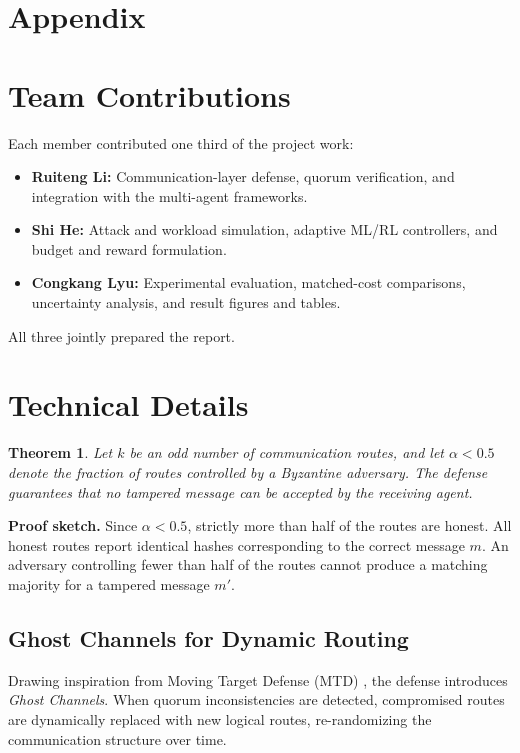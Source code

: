 \documentclass{article}
\newtheorem{theorem}{Theorem}
\begin{document}
\clearpage


\clearpage
\appendix
\section*{Appendix}
\section{Team Contributions}
Each member contributed one third of the project work:
\begin{itemize}
    \item \textbf{Ruiteng Li:} Communication-layer defense, quorum verification, and integration with the multi-agent frameworks.
    \item \textbf{Shi He:} Attack and workload simulation, adaptive {ML}/{RL} controllers, and budget and reward formulation.
    \item \textbf{Congkang Lyu:} Experimental evaluation, matched-cost comparisons, uncertainty analysis, and result figures and tables.
\end{itemize}
All three jointly prepared the report.

\section{Technical Details}
\begin{theorem}
Let $k$ be an odd number of communication routes, and let $\alpha < 0.5$ denote the fraction of routes controlled by a Byzantine adversary. The defense guarantees that no tampered message can be accepted by the receiving agent.
\end{theorem}
\textbf{Proof sketch.} Since $\alpha < 0.5$, strictly more than half of the routes are honest. All honest routes report identical hashes corresponding to the correct message $m$. An adversary controlling fewer than half of the routes cannot produce a matching majority for a tampered message $m'$.

\subsection{Ghost Channels for Dynamic Routing}
Drawing inspiration from Moving Target Defense ({MTD}) \citep{skowyra2020mtd, jailbreaker2024}, the defense introduces \textit{Ghost Channels}. When quorum inconsistencies are detected, compromised routes are dynamically replaced with new logical routes, re-randomizing the communication structure over time.
\end{document}
